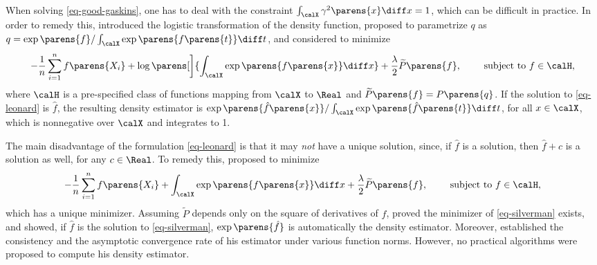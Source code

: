 \documentclass[12pt]{article}
\theoremstyle{definition}
\theoremstyle{theorem}
\theoremstyle{remark}
\begin{document}
When solving \eqref{eq-good-gaskins}, one has to deal with the constraint $\int_{\calX} \gamma^2 \parens{x} \diff x = 1$, which can be difficult in practice. In order to remedy this, \textcites{Leonard1978-mc} introduced the logistic transformation of the density function, proposed to parametrize $q$ as $q = \exp \parens{f} / \int_{\calX} \exp \parens{f \parens{t}} \diff t$, and considered to minimize 
\begin{align}\label{eq-leonard}
	- \frac{1}{n} \sum_{i=1}^n f \parens{X_i} + \log \parens[\bigg]{\int_{\calX} \exp\parens{f \parens{x}} \diff x} + \frac{\lambda}{2} \widetilde{P} \parens{f}, \qquad \text{ subject to } f \in \calH, 
\end{align}
where $\calH$ is a pre-specified class of functions mapping from $\calX$ to $\Real$ and $\widetilde{P} \parens{f} = P \parens{q}$. If the solution to \eqref{eq-leonard} is $\hat{f}$, the resulting density estimator is $\exp \parens{\hat{f} \parens{x}} / \int_{\calX} \exp \parens{\hat{f} \parens{t}} \diff t$, for all $x \in \calX$, which is nonnegative over $\calX$ and integrates to 1. 

The main disadvantage of the formulation \eqref{eq-leonard} is that it may \textit{not} have a unique solution, since, if $\hat{f}$ is a solution, then $\hat{f} + c$ is a solution as well, for any $c \in \Real$. To remedy this, \textcite{Silverman1982-ey} proposed to minimize 
\begin{align}\label{eq-silverman}
	- \frac{1}{n} \sum_{i=1}^n f \parens{X_i} + \int_{\calX} \exp \parens{f \parens{x}} \diff x + \frac{\lambda}{2} \widetilde{P} \parens{f}, \qquad \text{ subject to } f \in \calH, 
\end{align}
which has a unique minimizer. Assuming $\widetilde{P}$ depends only on the square of derivatives of $f$, \textcite{Silverman1982-ey} proved the minimizer of \eqref{eq-silverman} exists, and showed, if $\hat{f}$ is the solution to \eqref{eq-silverman}, $\exp \parens{\hat{f}}$ is automatically the density estimator. Moreover, \textcite{Silverman1982-ey} established the consistency and the asymptotic convergence rate of his estimator under various function norms. However, no practical algorithms were proposed to compute his density estimator. 
\end{document}

